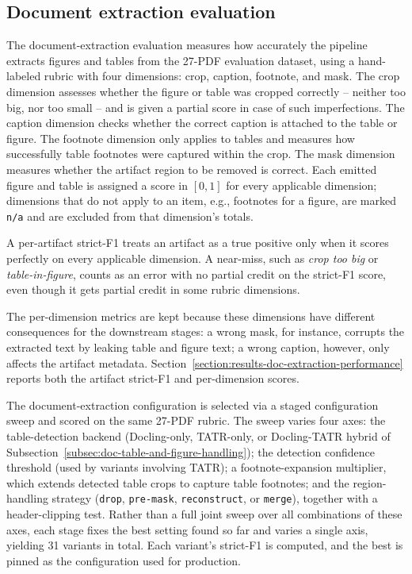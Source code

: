 \subsection{Document extraction evaluation}\label{subsec:eval-doc-extraction}

The document-extraction evaluation measures how accurately the pipeline extracts figures and tables from the 27-PDF evaluation dataset, using a hand-labeled rubric with four dimensions: crop, caption, footnote, and mask. The crop dimension assesses whether the figure or table was cropped correctly -- neither too big, nor too small -- and is given a partial score in case of such imperfections. The caption dimension checks whether the correct caption is attached to the table or figure. The footnote dimension only applies to tables and measures how successfully table footnotes were captured within the crop. The mask dimension measures whether the artifact region to be removed is correct. Each emitted figure and table is assigned a score in $[0,1]$ for every applicable dimension; dimensions that do not apply to an item, e.g., footnotes for a figure, are marked \texttt{n/a} and are excluded from that dimension's totals. 

A per-artifact strict-F1 treats an artifact as a true positive only when it scores perfectly on every applicable dimension. A near-miss, such as \emph{crop too big} or \emph{table-in-figure}, counts as an error with no partial credit on the strict-F1 score, even though it gets partial credit in some rubric dimensions. 

The per-dimension metrics are kept because these dimensions have different consequences for the downstream stages: a wrong mask, for instance, corrupts the extracted text by leaking table and figure text; a wrong caption, however, only affects the artifact metadata. Section~\ref{section:results-doc-extraction-performance} reports both the artifact strict-F1 and per-dimension scores. 

The document-extraction configuration is selected via a staged configuration sweep and scored on the same 27-PDF rubric. The sweep varies four axes: the table-detection backend (Docling-only, TATR-only, or Docling-TATR hybrid of Subsection~\ref{subsec:doc-table-and-figure-handling}); the detection confidence threshold (used by variants involving TATR); a footnote-expansion multiplier, which extends detected table crops to capture table footnotes; and the region-handling strategy (\texttt{drop}, \texttt{pre-mask}, \texttt{reconstruct}, or \texttt{merge}), together with a header-clipping test. Rather than a full joint sweep over all combinations of these axes, each stage fixes the best setting found so far and varies a single axis, yielding 31 variants in total. Each variant's strict-F1 is computed, and the best is pinned as the configuration used for production.